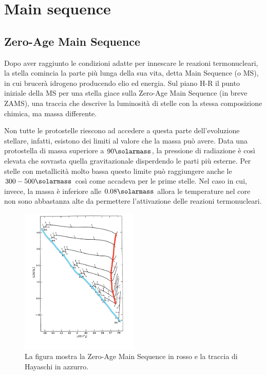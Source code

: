 \section{Main sequence}\label{sec:main-sequence}
\subsection{Zero-Age Main Sequence}
Dopo aver raggiunto le condizioni adatte per innescare le reazioni termonucleari, la stella comincia la parte più lunga della sua vita, detta Main Sequence (o MS), in cui brucerà idrogeno producendo elio ed energia. Sul piano H-R il punto iniziale della MS per una stella giace sulla Zero-Age Main Sequence (in breve ZAMS), una traccia che descrive la luminosità di stelle con la stessa composizione chimica, ma massa differente.

Non tutte le protostelle riescono ad accedere a questa parte dell'evoluzione stellare, infatti, esistono dei limiti al valore che la massa può avere. Data una protostella di massa superiore a $90 \si{\solarmass}$, la pressione di radiazione è così elevata che sovrasta quella gravitazionale disperdendo le parti più esterne. Per stelle con metallicità molto bassa questo limite può raggiungere anche le $300 - 500 \si{\solarmass}$ così come accadeva per le prime stelle. Nel caso in cui, invece, la massa è inferiore alle $0.08 \si{\solarmass}$ allora le temperature nel core non sono abbastanza alte da permettere l'attivazione delle reazioni termonucleari.

\begin{figure}
    \centering
    \includegraphics[width = 0.5\textwidth]{immagini/ZAMS.png}
    \caption{La figura mostra la Zero-Age Main Sequence in rosso e la traccia di Hayaschi in azzurro.}\label{fig:ZAMS}
\end{figure}

